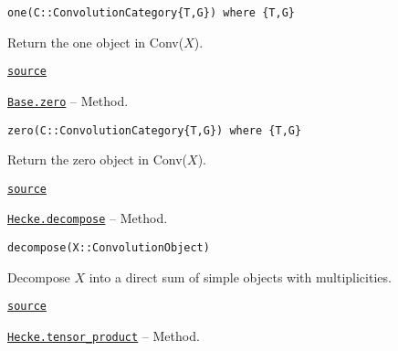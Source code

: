 \documentclass{memoir}
\begin{document}
\begin{adjustwidth}{2em}{0pt}


\begin{verbatim}
one(C::ConvolutionCategory{T,G}) where {T,G}
\end{verbatim}

Return the one object in Conv(\(X\)).



\href{https://github.com/FabianMaeurer/JuCat.jl/blob/367390e2d003deec2ababa73caeab405e934bb35/src/structures/ConvolutionCategory/ConvolutionCategory.jl#L176-L180}{\texttt{source}}


\end{adjustwidth}
\hypertarget{10692409214207844851}{} 
\hyperlink{10692409214207844851}{\texttt{Base.zero}}  -- {Method.}

\begin{adjustwidth}{2em}{0pt}


\begin{verbatim}
zero(C::ConvolutionCategory{T,G}) where {T,G}
\end{verbatim}

Return the zero object in Conv(\(X\)).



\href{https://github.com/FabianMaeurer/JuCat.jl/blob/367390e2d003deec2ababa73caeab405e934bb35/src/structures/ConvolutionCategory/ConvolutionCategory.jl#L140-L144}{\texttt{source}}


\end{adjustwidth}
\hypertarget{924957353456778592}{} 
\hyperlink{924957353456778592}{\texttt{Hecke.decompose}}  -- {Method.}

\begin{adjustwidth}{2em}{0pt}


\begin{verbatim}
decompose(X::ConvolutionObject)
\end{verbatim}

Decompose \(X\) into a direct sum of simple objects with multiplicities.



\href{https://github.com/FabianMaeurer/JuCat.jl/blob/367390e2d003deec2ababa73caeab405e934bb35/src/structures/ConvolutionCategory/ConvolutionCategory.jl#L218-L222}{\texttt{source}}


\end{adjustwidth}
\hypertarget{426415593810322569}{} 
\hyperlink{426415593810322569}{\texttt{Hecke.tensor\_product}}  -- {Method.}
\end{document}
